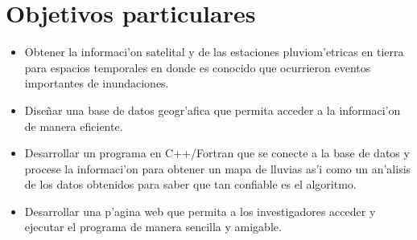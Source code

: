 \section{Objetivos particulares}
\begin{itemize}
 \item Obtener la informaci'on satelital y de las estaciones
   pluviom'etricas en tierra para espacios temporales en donde es 
conocido que ocurrieron eventos importantes de inundaciones.
 \item Dise\~nar una base de datos geogr'afica que permita acceder a la informaci'on de manera eficiente.
 \item Desarrollar un programa en C++/Fortran que se conecte a la base de datos y procese la informaci'on para obtener
un mapa de lluvias as'i como un an'alisis de los datos obtenidos para saber que tan confiable es el algoritmo.
 \item Desarrollar una p'agina web que permita a los investigadores
   acceder y ejecutar el programa de manera sencilla y amigable.
\end{itemize}
